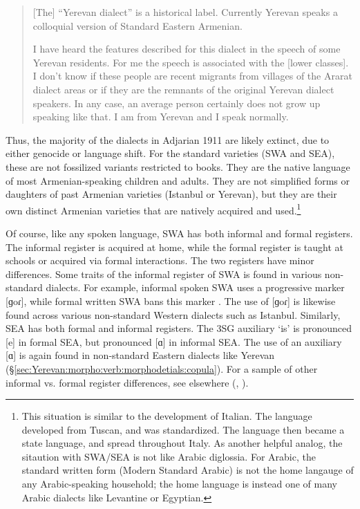 \begin{quote}
	[The] ``Yerevan dialect'' is a historical label. Currently Yerevan speaks a colloquial version of Standard Eastern Armenian.
	
	I have heard the features described for this dialect in the speech of some Yerevan residents. For me the speech is associated with the [lower classes]. I don't know if these people are recent migrants from villages of the Ararat dialect areas or if they are the remnants of the original Yerevan dialect speakers. In any case, an average person certainly does not grow up speaking like that. I am from Yerevan and I speak normally. 
\end{quote}

Thus, the majority of the dialects in Adjarian 1911 are likely extinct, due to either genocide or language shift. For the standard varieties (SWA and SEA), these are not fossilized variants restricted to books. They are the native language of most Armenian-speaking children and adults. They are not simplified forms or daughters of past Armenian varieties (Istanbul or Yerevan), but they are their own distinct Armenian varieties that are natively acquired and used.\footnote{This situation is similar to the development of Italian. The language developed from Tuscan, and was standardized. The language then became a state language, and spread throughout Italy. As another helpful analog, the sitaution with SWA/SEA is not like Arabic diglossia. For Arabic, the standard written form (Modern Standard Arabic) is not the home langauge of any Arabic-speaking household; the home language is instead one of many Arabic dialects like Levantine or Egyptian. }





Of course, like any spoken language, SWA has both informal and formal registers. The informal register is acquired at home, while the formal register is taught at schools or acquired via formal interactions. The two registers have minor differences. Some traits of the informal register of SWA is found in various non-standard dialects. For example, informal spoken SWA uses a progressive marker [ɡoɾ], while formal written SWA bans this marker \citep{donabedian-2001-tabouLinguisticArmenianOccidentalGorProgressive}. The use of [ɡoɾ] is likewise found across various non-standard Western dialects such as Istanbul. Similarly, SEA has both formal and informal registers. The 3SG auxiliary `is' is pronounced [e] in formal SEA, but pronounced [ɑ] in informal SEA. The use of an auxiliary [ɑ] is again found in non-standard Eastern dialects like Yerevan (\S\ref{sec:Yerevan:morpho:verb:morphodetials:copula}). For a sample of other informal vs. formal register differences, see elsewhere (\citealt{Gharagyulyan-1981-ColloquialArmenian,Zakaryan-1981-ColloquialArmenian,Aghayan-1981-ColloquialArmenian,Kavassian-1983-CertainProblemMorphologyArmenianMontreal,DumTragut-2009-ArmenianReferenceGrammar}, \citealt[ch3]{Karapetian-2014-TeachArmenianEasternArmenianHeritage}).


